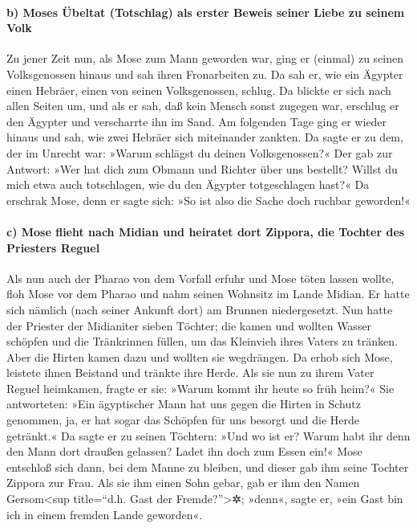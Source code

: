 \hypertarget{b-moses-uxfcbeltat-totschlag-als-erster-beweis-seiner-liebe-zu-seinem-volk}{%
\paragraph{b) Moses Übeltat (Totschlag) als erster Beweis seiner Liebe
zu seinem
Volk}\label{b-moses-uxfcbeltat-totschlag-als-erster-beweis-seiner-liebe-zu-seinem-volk}}

 Zu jener Zeit nun, als Mose zum Mann geworden war, ging
er (einmal) zu seinen Volksgenossen hinaus und sah ihren Fronarbeiten
zu. Da sah er, wie ein Ägypter einen Hebräer, einen von seinen
Volksgenossen, schlug.  Da blickte er sich nach allen
Seiten um, und als er sah, daß kein Mensch sonst zugegen war, erschlug
er den Ägypter und verscharrte ihn im Sand.  Am folgenden
Tage ging er wieder hinaus und sah, wie zwei Hebräer sich miteinander
zankten. Da sagte er zu dem, der im Unrecht war: »Warum schlägst du
deinen Volksgenossen?«  Der gab zur Antwort: »Wer hat
dich zum Obmann und Richter über uns bestellt? Willst du mich etwa auch
totschlagen, wie du den Ägypter totgeschlagen hast?« Da erschrak Mose,
denn er sagte sich: »So ist also die Sache doch ruchbar geworden!«

\hypertarget{c-mose-flieht-nach-midian-und-heiratet-dort-zippora-die-tochter-des-priesters-reguel}{%
\paragraph{c) Mose flieht nach Midian und heiratet dort Zippora, die
Tochter des Priesters
Reguel}\label{c-mose-flieht-nach-midian-und-heiratet-dort-zippora-die-tochter-des-priesters-reguel}}

 Als nun auch der Pharao von dem Vorfall erfuhr und Mose
töten lassen wollte, floh Mose vor dem Pharao und nahm seinen Wohnsitz
im Lande Midian. Er hatte sich nämlich (nach seiner Ankunft dort) am
Brunnen niedergesetzt.  Nun hatte der Priester der
Midianiter sieben Töchter; die kamen und wollten Wasser schöpfen und die
Tränkrinnen füllen, um das Kleinvieh ihres Vaters zu tränken.
 Aber die Hirten kamen dazu und wollten sie wegdrängen.
Da erhob sich Mose, leistete ihnen Beistand und tränkte ihre Herde.
 Als sie nun zu ihrem Vater Reguel heimkamen, fragte er
sie: »Warum kommt ihr heute so früh heim?«  Sie
antworteten: »Ein ägyptischer Mann hat uns gegen die Hirten in Schutz
genommen, ja, er hat sogar das Schöpfen für uns besorgt und die Herde
getränkt.«  Da sagte er zu seinen Töchtern: »Und wo ist
er? Warum habt ihr denn den Mann dort draußen gelassen? Ladet ihn doch
zum Essen ein!«  Mose entschloß sich dann, bei dem Manne
zu bleiben, und dieser gab ihm seine Tochter Zippora zur Frau.
 Als sie ihm einen Sohn gebar, gab er ihm den Namen
Gersom\textless sup title=``d.h. Gast der Fremde?''\textgreater✲;
»denn«, sagte er, »ein Gast bin ich in einem fremden Lande geworden«.

